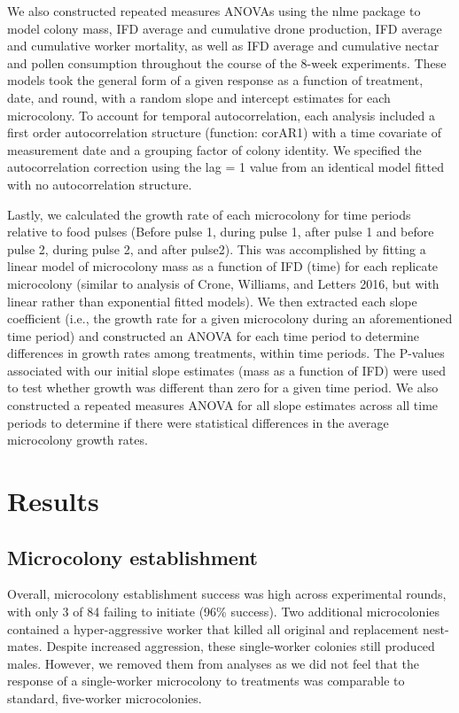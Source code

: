 \documentclass[11pt,]{article}
\begin{document}
We also constructed repeated measures ANOVAs using the nlme package to
model colony mass, IFD average and cumulative drone production, IFD
average and cumulative worker mortality, as well as IFD average and
cumulative nectar and pollen consumption throughout the course of the
8-week experiments. These models took the general form of a given
response as a function of treatment, date, and round, with a random
slope and intercept estimates for each microcolony. To account for
temporal autocorrelation, each analysis included a first order
autocorrelation structure (function: corAR1) with a time covariate of
measurement date and a grouping factor of colony identity. We specified
the autocorrelation correction using the lag = 1 value from an identical
model fitted with no autocorrelation structure.

Lastly, we calculated the growth rate of each microcolony for time
periods relative to food pulses (Before pulse 1, during pulse 1, after
pulse 1 and before pulse 2, during pulse 2, and after pulse2). This was
accomplished by fitting a linear model of microcolony mass as a function
of IFD (time) for each replicate microcolony (similar to analysis of
Crone, Williams, and Letters 2016, but with linear rather than
exponential fitted models). We then extracted each slope coefficient
(i.e., the growth rate for a given microcolony during an aforementioned
time period) and constructed an ANOVA for each time period to determine
differences in growth rates among treatments, within time periods. The
P-values associated with our initial slope estimates (mass as a function
of IFD) were used to test whether growth was different than zero for a
given time period. We also constructed a repeated measures ANOVA for all
slope estimates across all time periods to determine if there were
statistical differences in the average microcolony growth rates.

\hypertarget{results}{%
\section{Results}\label{results}}

\hypertarget{microcolony-establishment}{%
\subsection{Microcolony establishment}\label{microcolony-establishment}}

Overall, microcolony establishment success was high across experimental
rounds, with only 3 of 84 failing to initiate (96\% success). Two
additional microcolonies contained a hyper-aggressive worker that killed
all original and replacement nest-mates. Despite increased aggression,
these single-worker colonies still produced males. However, we removed
them from analyses as we did not feel that the response of a
single-worker microcolony to treatments was comparable to standard,
five-worker microcolonies.
\end{document}

